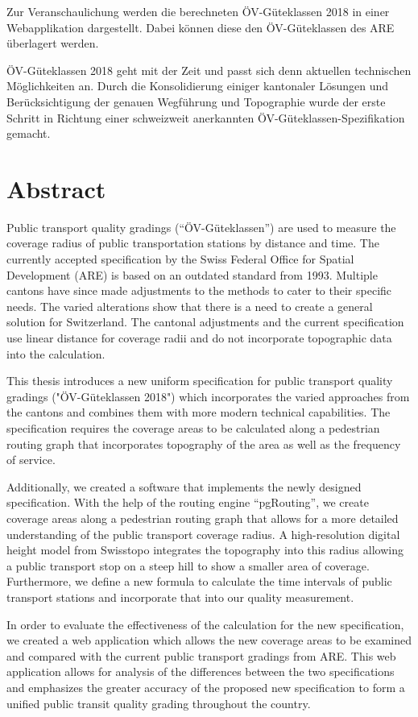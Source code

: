 Zur Veranschaulichung werden die berechneten ÖV-Güteklassen 2018 in einer
Webapplikation dargestellt.
Dabei können diese den ÖV-Güteklassen des ARE überlagert werden.

ÖV-Güteklassen 2018 geht mit der Zeit und passt sich denn aktuellen technischen Möglichkeiten an.
Durch die Konsolidierung einiger kantonaler Lösungen und Berücksichtigung der genauen Wegführung und Topographie wurde der erste Schritt in Richtung einer schweizweit anerkannten ÖV-Güteklassen-Spezifikation gemacht.

\cleardoublepage

\chapter*{Abstract}

Public transport quality gradings ("`ÖV-Güteklassen"') are used to measure the coverage radius of public transportation stations by distance and time.
The currently accepted specification by the Swiss Federal Office for Spatial Development (ARE) is based on an outdated standard from 1993.
Multiple cantons have since made adjustments to the methods to cater to their specific needs.
The varied alterations show that there is a need to create a general solution for Switzerland.
The cantonal adjustments and the current specification use linear distance for coverage radii and do not incorporate topographic data into the calculation.

This thesis introduces a new uniform specification for public transport quality gradings ("ÖV-Güteklassen 2018") which incorporates the varied approaches from the cantons and combines them with more modern technical capabilities.
The specification requires the coverage areas to be calculated along a pedestrian routing graph that incorporates topography of the area as well as the frequency of service.

Additionally, we created a software that implements the newly designed specification.
With the help of the routing engine "`pgRouting"', we create coverage areas along a pedestrian routing graph that allows for a more detailed understanding of the public transport coverage radius.
A high-resolution digital height model from Swisstopo integrates the topography into this radius allowing a public transport stop on a steep hill to show a smaller area of coverage.
Furthermore, we define a new formula to calculate the time intervals of public transport stations and incorporate that into our quality measurement.

In order to evaluate the effectiveness  of the calculation for the new specification, we created a web application which allows the new coverage areas to be examined and compared with the current public transport gradings from ARE.
This web application allows for analysis of the differences between the two specifications and emphasizes the greater accuracy of the proposed new specification to form a unified public transit quality grading throughout the country.
